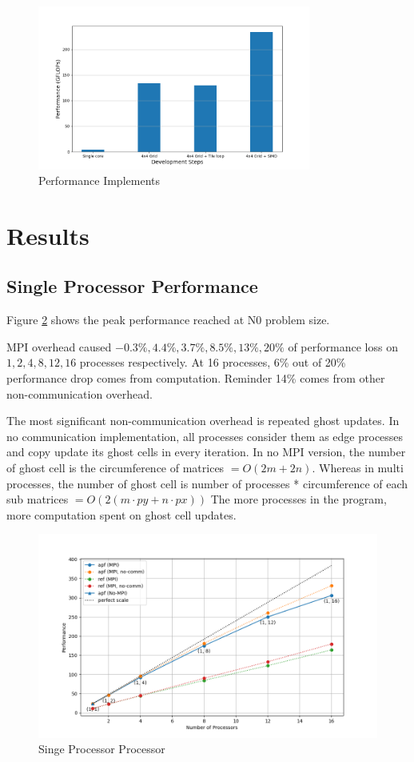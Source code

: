 \documentclass[12pt]{article}
\begin{document}
\begin{figure}[h]
    \centering
    \includegraphics[width=0.8\textwidth]{img/pi.png}
    \caption{Performance Implements}
    \label{fig:pi}
\end{figure}

\section{Results}

\subsection{Single Processor Performance}
Figure \ref{fig:N0} shows the peak performance reached at N0 problem size.

MPI overhead caused $-0.3\%, 4.4\%, 3.7\%, 8.5\%, 13\%, 20\%$ of performance loss
on $1,2,4,8,12,16$ processes respectively. 
At 16 processes, 6\% out of 20\% performance drop comes from computation.
Reminder 14\% comes from other non-communication overhead. 

The most significant non-communication overhead is repeated ghost updates.
In no communication implementation, 
all processes consider them as edge processes
and copy update its ghost cells in every iteration. 
In no MPI version, the number of ghost cell is 
the circumference of matrices $ = O(2m + 2n)$.
Whereas in multi processes, the number of ghost cell is 
number of processes * circumference of each sub matrices $ = O(2(m\cdot py+n \cdot px))$
The more processes in the program, more computation spent on ghost cell updates.

\begin{figure}[h]
    \centering
    \includegraphics[width=\textwidth]{img/N0.png}
    \caption{Singe Processor Processor}
    \label{fig:N0}
\end{figure}
\end{document}
